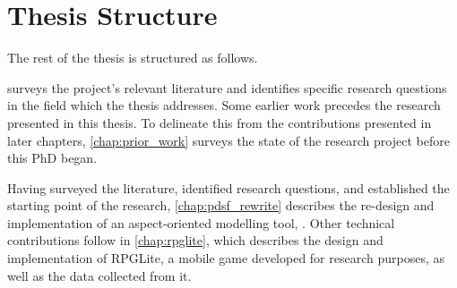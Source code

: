 






\section{Thesis Structure}
\label{intro_thesis_structure}

The rest of the thesis is structured as follows.

 surveys the project's relevant literature and identifies
specific research questions in the field which the thesis addresses. Some
earlier work precedes the research presented in this thesis. To delineate this
from the contributions presented in later chapters, \cref{chap:prior_work}
surveys the state of the research project before this PhD began.

Having surveyed the literature, identified research questions, and established
the starting point of the research, \cref{chap:pdsf_rewrite} describes the
re-design and implementation of an aspect-oriented modelling tool, \pdsf{}.
Other technical contributions follow in \cref{chap:rpglite}, which describes the
design and implementation of RPGLite, a mobile game developed for research
purposes, as well as the data collected from it.

